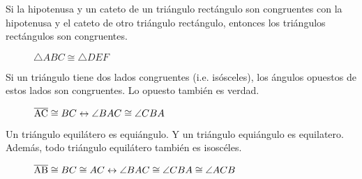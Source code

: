 \clearpage

\begin{postulate}
    Si la hipotenusa y un cateto de un triángulo rectángulo son congruentes con la hipotenusa y el cateto de otro triángulo rectángulo, entonces los triángulos rectángulos son congruentes.

    \begin{figure}[h!]

        \centering

        \begin{subfigure}[b]{.5\textwidth}
            \centering
            
            \label{fig:congruence-hlc1}
        \end{subfigure}%
        \begin{subfigure}[b]{.5\textwidth}
            \centering
            
            \label{fig:congruence-hlc2}
        \end{subfigure}

        \centering
        \caption{$\triangle{ABC} \cong \triangle{DEF}$}
        \label{fig:congruencia-hlc}
        
    \end{figure}    
        
\end{postulate}

\begin{theorem}
    Si un triángulo tiene dos lados congruentes (i.e. isósceles), los ángulos opuestos de estos lados son congruentes. Lo opuesto también es verdad.

        \begin{figure}[!h]
            \centering
            
            \label{fig:isosceles}
            \caption{$\overline{\rm AC} \cong {BC} \leftrightarrow \angle{BAC} \cong \angle{CBA}$}            
        \end{figure}
\end{theorem}

\begin{theorem}
    Un triángulo equilátero es equiángulo. Y un triángulo equiángulo es equilatero. Además, todo triángulo equilátero también es isoscéles.

    \begin{figure}[!h]
        \centering
        
        \label{fig:equilateral}
        \caption{$\overline{\rm AB} \cong {BC}  \cong {AC} \leftrightarrow \angle{BAC} \cong \angle{CBA} \cong \angle{ACB}$}            
    \end{figure}
    
\end{theorem}

